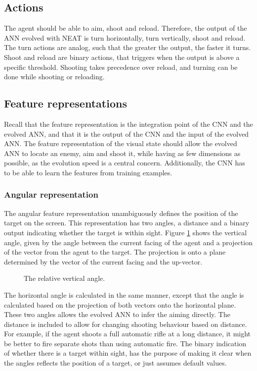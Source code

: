 \subsection{Actions}
The agent should be able to aim, shoot and reload. Therefore, the output of the ANN evolved with NEAT is turn horizontally, turn vertically, shoot and reload. The turn actions are analog, such that the greater the output, the faster it turns. Shoot and reload are binary actions, that triggers when the output is above a specific threshold. Shooting takes precedence over reload, and turning can be done while shooting or reloading.

\subsection{Feature representations}
Recall that the feature representation is the integration point of the CNN and the evolved ANN, and that it is the output of the CNN and the input of the evolved ANN.
The feature representation of the visual state should allow the evolved ANN to locate an enemy, aim and shoot it, while having as few dimensions as possible, as the evolution speed is a central concern. Additionally, the CNN has to be able to learn the features from training examples.

\subsubsection{Angular representation}
\label{sec:angular}
The angular feature representation unambiguously defines the position of the target on the screen. This representation has two angles, a distance and a binary output indicating whether the target is within sight. Figure \ref{fig:angular} shows the vertical angle, given by the angle between the current facing of the agent and a projection of the vector from the agent to the target. The projection is onto a plane determined by the vector of the current facing and the up-vector.
\begin{figure}[H]
    \centering
    	\begin{scriptsize}
		\sffamily
    	
    	\end{scriptsize}
        \vspace{-10mm}
    \caption{The relative vertical angle.}
    \label{fig:angular}
\end{figure}
\noindent
The horizontal angle is calculated in the same manner, except that the angle is calculated based on the projection of both vectors onto the horizontal plane. These two angles allows the evolved ANN to infer the aiming directly. The distance is included to allow for changing shooting behaviour based on distance. For example, if the agent shoots a full automatic rifle at a long distance, it might be better to fire separate shots than using automatic fire. The binary indication of whether there is a target within sight, has the purpose of making it clear when the angles reflects the position of a target, or just assumes default values.

